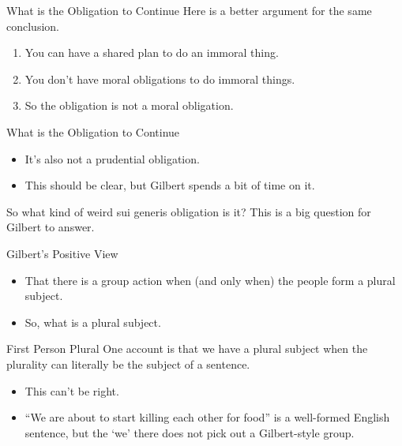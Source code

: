 \documentclass[
  ignorenonframetext,
]{beamer}
\providecommand{\tightlist}{%
  \setlength{\itemsep}{0pt}\setlength{\parskip}{0pt}}
\begin{document}
\begin{frame}{What is the Obligation to Continue}
\protect\hypertarget{what-is-the-obligation-to-continue-1}{}
Here is a better argument for the same conclusion.

\begin{enumerate}
\tightlist
\item
  You can have a shared plan to do an immoral thing.
\item
  You don't have moral obligations to do immoral things.
\item
  So the obligation is not a moral obligation.
\end{enumerate}
\end{frame}

\begin{frame}{What is the Obligation to Continue}
\protect\hypertarget{what-is-the-obligation-to-continue-2}{}
\begin{itemize}
\tightlist
\item
  It's also not a prudential obligation.
\item
  This should be clear, but Gilbert spends a bit of time on it. \pause
\end{itemize}

So what kind of weird sui generis obligation is it? This is a big
question for Gilbert to answer.
\end{frame}

\begin{frame}{Gilbert's Positive View}
\protect\hypertarget{gilberts-positive-view}{}
\begin{itemize}
\tightlist
\item
  That there is a group action when (and only when) the people form a
  plural subject.
\item
  So, what is a plural subject.
\end{itemize}
\end{frame}

\begin{frame}{First Person Plural}
\protect\hypertarget{first-person-plural}{}
One account is that we have a plural subject when the plurality can
literally be the subject of a sentence.

\begin{itemize}
\tightlist
\item
  This can't be right.
\item
  ``We are about to start killing each other for food'' is a well-formed
  English sentence, but the `we' there does not pick out a Gilbert-style
  group.
\end{itemize}
\end{frame}
\end{document}
